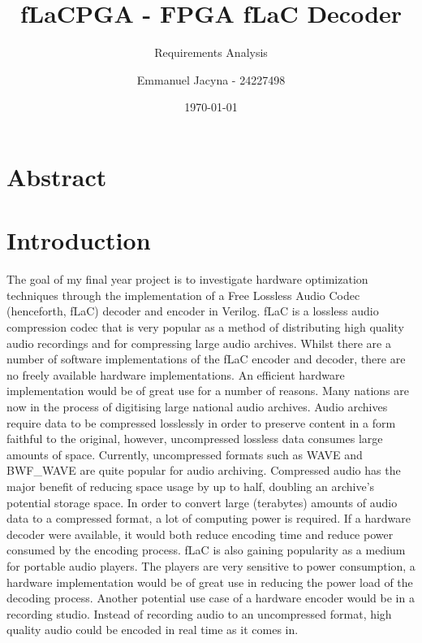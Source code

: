 \documentclass[12pt]{scrartcl}
\title{fLaCPGA - FPGA fLaC Decoder}
\subtitle{Requirements Analysis}
\author{Emmanuel Jacyna - 24227498}
\date{\today}
\begin{document}
\pagestyle{myheadings}
  \maketitle
  \tableofcontents
  
  \section*{Abstract}
  
  \section{Introduction}
  The goal of my final year project is to investigate hardware optimization techniques through the implementation of a Free Lossless Audio Codec (henceforth, fLaC) decoder and encoder in Verilog. fLaC is a lossless audio compression codec that is very popular as a method of distributing high quality audio recordings and for compressing large audio archives\cite{flac_popular}. Whilst there are a number of software implementations of the fLaC encoder and decoder, there are no freely available hardware implementations. An efficient hardware implementation would be of great use for a number of reasons. Many nations are now in the process of digitising large national audio archives. Audio archives require data to be compressed losslessly in order to preserve content in a form faithful to the original, however, uncompressed lossless data consumes large amounts of space. Currently, uncompressed formats such as WAVE and BWF\_WAVE are quite popular for audio archiving\cite{pres_fmts}. Compressed audio has the major benefit of reducing space usage by up to half, doubling an archive's potential storage space. In order to convert large (terabytes) amounts of audio data to a compressed format, a lot of computing power is required. If a hardware decoder were available, it would both reduce encoding time and reduce power consumed by the encoding process. fLaC is also gaining popularity as a medium for portable audio players. The players are very sensitive to power consumption, a hardware implementation would be of great use in reducing the power load of the decoding process. Another potential use case of a hardware encoder would be in a recording studio. Instead of recording audio to an uncompressed format, high quality audio could be encoded in real time as it comes in.
  
\end{document}
